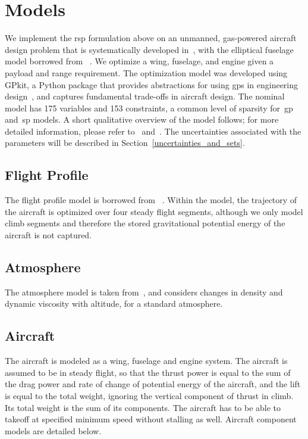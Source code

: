 \section{Models}

We implement the \gls{rsp} formulation above on an unmanned, gas-powered
aircraft design problem that is systematically developed in~\cite{Ozturk2018},
with the elliptical fuselage model borrowed from ~\cite{Burton2017}.
We optimize a wing, fuselage, and engine given a payload and range requirement.
The optimization model was developed using GPkit, a Python package that
provides abstractions for using \gls{gp}s in engineering design~\cite{gpkit}, and
captures fundamental trade-offs in aircraft design.
The nominal model has 175 variables and 153 constraints, a common level of
sparsity for~\gls{gp} and~\gls{sp} models.
A short qualitative overview of the model follows; for
more detailed information, please refer to~\cite{Burton2017} and~\cite{Ozturk2018}. The uncertainties
associated with the parameters will be described in Section~\ref{uncertainties_and_sets}.

\subsection{Flight Profile}

The flight profile model is borrowed from ~\cite{York2018}. Within the model, the
trajectory of the aircraft is optimized over four steady flight segments,
although we only model climb segments
and therefore the stored gravitational potential energy of the aircraft is not captured.

\subsection{Atmosphere}

The atmosphere model is taken from~\cite{Tao2018}, and considers changes in density and dynamic
viscosity with altitude, for a standard atmosphere.

\subsection{Aircraft}

The aircraft is modeled as a wing, fuselage and engine system. The aircraft is assumed
to be in steady flight, so that the thrust power is equal to the sum of the drag power and rate of change
of potential energy of the aircraft, and the lift is equal to the total weight, ignoring the vertical component of
thrust in climb. Its total weight is the sum of its components.
The aircraft has to be able to takeoff at specified minimum speed without stalling as well.
Aircraft component models are detailed below.


